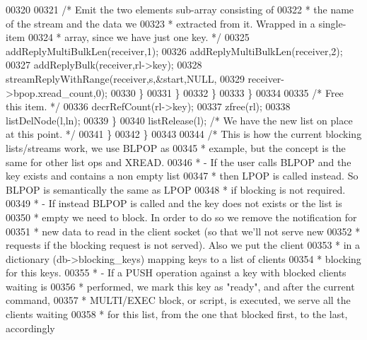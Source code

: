 \begin{DoxyCode}
00320 
00321                             \textcolor{comment}{/* Emit the two elements sub-array consisting of}
00322 \textcolor{comment}{                             * the name of the stream and the data we}
00323 \textcolor{comment}{                             * extracted from it. Wrapped in a single-item}
00324 \textcolor{comment}{                             * array, since we have just one key. */}
00325                             addReplyMultiBulkLen(receiver,1);
00326                             addReplyMultiBulkLen(receiver,2);
00327                             addReplyBulk(receiver,rl->key);
00328                             streamReplyWithRange(receiver,s,&start,NULL,
00329                                                  receiver->bpop.xread\_count,0);
00330                         \}
00331                     \}
00332                 \}
00333             \}
00334 
00335             \textcolor{comment}{/* Free this item. */}
00336             decrRefCount(rl->key);
00337             zfree(rl);
00338             listDelNode(l,ln);
00339         \}
00340         listRelease(l); \textcolor{comment}{/* We have the new list on place at this point. */}
00341     \}
00342 \}
00343 
00344 \textcolor{comment}{/* This is how the current blocking lists/streams work, we use BLPOP as}
00345 \textcolor{comment}{ * example, but the concept is the same for other list ops and XREAD.}
00346 \textcolor{comment}{ * - If the user calls BLPOP and the key exists and contains a non empty list}
00347 \textcolor{comment}{ *   then LPOP is called instead. So BLPOP is semantically the same as LPOP}
00348 \textcolor{comment}{ *   if blocking is not required.}
00349 \textcolor{comment}{ * - If instead BLPOP is called and the key does not exists or the list is}
00350 \textcolor{comment}{ *   empty we need to block. In order to do so we remove the notification for}
00351 \textcolor{comment}{ *   new data to read in the client socket (so that we'll not serve new}
00352 \textcolor{comment}{ *   requests if the blocking request is not served). Also we put the client}
00353 \textcolor{comment}{ *   in a dictionary (db->blocking\_keys) mapping keys to a list of clients}
00354 \textcolor{comment}{ *   blocking for this keys.}
00355 \textcolor{comment}{ * - If a PUSH operation against a key with blocked clients waiting is}
00356 \textcolor{comment}{ *   performed, we mark this key as "ready", and after the current command,}
00357 \textcolor{comment}{ *   MULTI/EXEC block, or script, is executed, we serve all the clients waiting}
00358 \textcolor{comment}{ *   for this list, from the one that blocked first, to the last, accordingly}

\end{DoxyCode}
